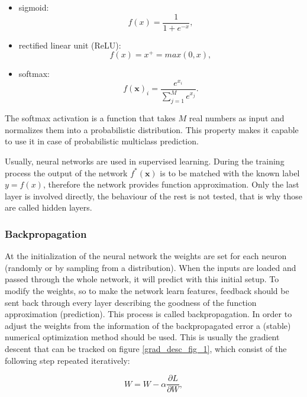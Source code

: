 \documentclass[12pt]{article}
\theoremstyle{plain}
\begin{document}
\begin{itemize}
	\item sigmoid: 
	\begin{equation}
	f(x) = \frac{1}{1 + e^{-x}},
	\end{equation}		
	\item rectified linear unit (ReLU):
	\begin{equation}
	f(x) = x^+ = max(0,x),
	\end{equation}
	\item softmax:
	\begin{equation}
	f(\mathbf{x})_i = \frac{e^{x_i}}{\sum_{j=1}^M e^{x_j}}.
	\end{equation}
\end{itemize}

The softmax activation is a function that takes $M$ real numbers as input and normalizes them into a probabilistic distribution. This property makes it capable to use it in case of probabilistic multiclass prediction.

Usually, neural networks are used in supervised learning. During the training process the output of the network $f^*(\textbf{x})$ is to be matched with the known label $y=f(x)$, therefore the network provides function approximation. Only the last layer is involved directly, the behaviour of the rest is not tested, that is why those are called hidden layers.

\subsubsection{Backpropagation}

At the initialization of the neural network the weights are set for each neuron (randomly or by sampling from a distribution). When the inputs are loaded and passed through the whole network, it will predict with this initial setup. To modify the weights, so to make the network learn features, feedback should be sent back through every layer describing the goodness of the function approximation (prediction). This process is called backpropagation. In order to adjust the weights from the information of the backpropagated error a (stable) numerical optimization method should be used. This is usually the gradient descent that can be tracked on figure \ref{grad_desc_fig_1}, which consist of the following step repeated iteratively:

\begin{equation}
W = W - \alpha \frac{ \partial L}{ \partial W},
\end{equation}
\end{document}
